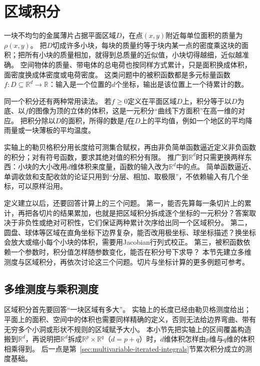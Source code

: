 \section{区域积分}
\label{sec:multivariable-region-integration}

一块不均匀的金属薄片占据平面区域$D$，在点$(x,y)$附近每单位面积的质量为$\rho(x,y)$。
把$D$切成许多小块，每块的质量约等于块内某一点的密度乘这块的面积；把所有小块的质量相加，就得到总质量的近似值，小块切得越细，近似越准确。
空间物体的质量、带电体的总电荷也按同样方式累计，只是面积换成体积，面密度换成体密度或电荷密度。
这类问题中的被积函数都是多元标量函数$f:D\subseteq\mathbb R^d\to\mathbb R$：输入是一个位置的$d$个坐标，输出是该位置上一个待累计的数。

同一个积分还有两种常用读法。
若$f\geq0$定义在平面区域$D$上，积分等于以$D$为底、以$f$的图像为顶的立体的体积，这是一元积分“曲线下方面积”在高一维的对应。
把积分除以$D$的面积，所得的数是$f$在$D$上的平均值，例如一个地区的平均降雨量或一块薄板的平均温度。

实轴上的勒贝格积分用长度给可测集合赋权，再由非负简单函数逼近定义非负函数的积分；对有符号函数，要求其绝对值的积分有限。
推广到$\mathbb R^d$时只需更换两样东西：小块的大小改用$d$维体积来度量，函数的输入改为$\mathbb R^d$中的点。
简单函数逼近、单调收敛和支配收敛的论证只用到“分层、相加、取极限”，不依赖输入有几个坐标，可以原样沿用。

定义建立以后，还要回答计算上的三个问题。
第一，能否先算每一条切片上的累计，再把各切片的结果累加，也就是把区域积分拆成逐个坐标的一元积分？答案取决于非负性或绝对可积性，它们保证两种累计次序给出同一个区域积分。
第二，圆盘、球体等区域在直角坐标下边界复杂，能否改用极坐标、球坐标描述？换坐标会放大或缩小每个小块的体积，需要用Jacobian行列式校正。
第三，被积函数依赖一个参数时，积分值怎样随参数变化，能否在积分号下求导？
本节先建立多维测度与区域积分，再依次讨论这三个问题。切片与坐标计算的更多例题可参考。

\subsection{多维测度与乘积测度}
\label{sec:comb-multidimensional-product-measure}

区域积分首先要回答“一块区域有多大”。
实轴上的长度已经由勒贝格测度给出；平面上的面积、空间中的体积也需要同样精确的定义，否则无法给边界弯曲、带有无穷多个小洞或形状不规则的区域赋予大小。
本小节先把实轴上的区间覆盖构造搬到$\mathbb R^d$，再说明把$\mathbb R^d$拆成$\mathbb R^p\times\mathbb R^q$（$d=p+q$）时，$d$维体积怎样由$p$维与$q$维的体积相乘得到。
后一点是第~\ref{sec:multivariable-iterated-integrals}节累次积分成立的测度基础。

